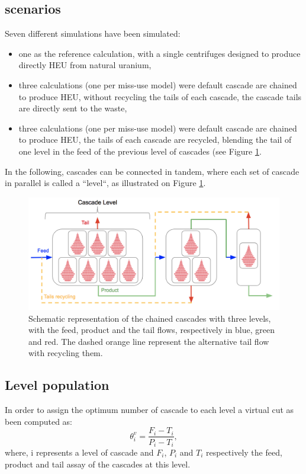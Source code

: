 \subsection{scenarios}
Seven different simulations have been simulated:
\begin{itemize}
\item one as the reference calculation, with a single centrifuges designed to
    produce directly \gls{HEU} from natural uranium,
\item three calculations (one per miss-use model) were default cascade are
    chained to produce \gls{HEU}, without recycling the tails of each cascade,
    the cascade tails are directly sent to the waste,
\item three calculations (one per miss-use model) were default cascade are
    chained to produce \gls{HEU}, the tails of each cascade are recycled, blending
    the tail of one level in the feed of the previous level of
    cascades (see Figure \ref{fig:cascade_level}.
\end{itemize}
In the following, cascades can be connected in tandem, where each set of cascade
in parallel is called a ``level``, as illustrated on Figure
\ref{fig:cascade_level}.

\begin{figure}[ht] %
    \centering
    \includegraphics[scale=0.45]{flow}
    \caption{Schematic representation of the chained cascades with three levels,
    with the feed, product and the tail flows, respectively in blue, green and
    red. The dashed orange line represent the alternative tail flow with
    recycling them.}
    \label{fig:cascade_level}
\end{figure}


\subsection{Level population}
In order to assign the optimum number of cascade to each level a virtual cut as
been computed as:
\begin{equation}
    \theta^{v}_{i} = \frac{F_{i}-T_{i}}{P_{i}-T_{i}},
\end{equation}
where, i represents a level of cascade and $F_{i}$, $P_{i}$ and $T_{i}$
respectively the feed, product and tail assay of the cascades at this level.


